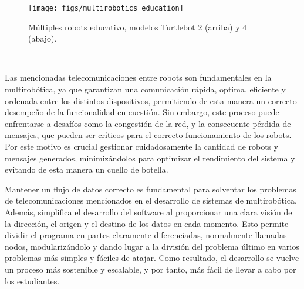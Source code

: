 \begin{figure} [h!]
  \begin{center}
    \texttt{[image: figs/multirobotics\_education]}
  \end{center}
  \caption{Múltiples robots educativo, modelos Turtlebot 2 (arriba) y 4 (abajo).}
  \label{fig:robots_education}
\end{figure}\

Las mencionadas telecomunicaciones entre robots son fundamentales en la
multirobótica, ya que garantizan una comunicación rápida, optima,
eficiente y ordenada entre los distintos dispositivos, permitiendo de esta
manera un correcto desempeño de la funcionalidad en cuestión.
Sin embargo, este proceso puede enfrentarse a desafíos como la congestión de la
red, y la consecuente pérdida de mensajes, que pueden ser críticos para el
correcto funcionamiento de los robots.
Por este motivo es crucial gestionar cuidadosamente la cantidad de robots y
mensajes generados, minimizándolos para optimizar el rendimiento del sistema y
evitando de esta manera un cuello de botella.

Mantener un flujo de datos correcto es fundamental para solventar los problemas
de telecomunicaciones mencionados en el desarrollo de sistemas de multirobótica.
Además, simplifica el desarrollo del software al proporcionar una clara visión
de la dirección, el origen y el destino de los datos en cada momento.
Esto permite dividir el programa en partes claramente diferenciadas, normalmente
llamadas nodos, modularizándolo y dando lugar a la división del problema último
en varios problemas más simples y fáciles de atajar.
Como resultado, el desarrollo se vuelve un proceso más sostenible y escalable, y
por tanto, más fácil de llevar a cabo por los estudiantes.

